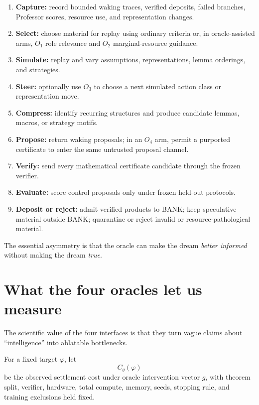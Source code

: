 \begin{enumerate}[leftmargin=2em]
\item \textbf{Capture:} record bounded waking traces, verified deposits, failed branches, Professor scores, resource use, and representation changes.
\item \textbf{Select:} choose material for replay using ordinary criteria or, in oracle-assisted arms, $O_1$ role relevance and $O_2$ marginal-resource guidance.
\item \textbf{Simulate:} replay and vary assumptions, representations, lemma orderings, and strategies.
\item \textbf{Steer:} optionally use $O_3$ to choose a next simulated action class or representation move.
\item \textbf{Compress:} identify recurring structures and produce candidate lemmas, macros, or strategy motifs.
\item \textbf{Propose:} return waking proposals; in an $O_4$ arm, permit a purported certificate to enter the same untrusted proposal channel.
\item \textbf{Verify:} send every mathematical certificate candidate through the frozen verifier.
\item \textbf{Evaluate:} score control proposals only under frozen held-out protocols.
\item \textbf{Deposit or reject:} admit verified products to BANK; keep speculative material outside BANK; quarantine or reject invalid or resource-pathological material.
\end{enumerate}

The essential asymmetry is that the oracle can make the dream \emph{better informed} without making the dream \emph{true}.

\section{What the four oracles let us measure}

The scientific value of the four interfaces is that they turn vague claims about ``intelligence'' into ablatable bottlenecks.

For a fixed target $\varphi$, let
\begin{equation}
C_g(\varphi)
\end{equation}
be the observed settlement cost under oracle intervention vector $g$, with theorem split, verifier, hardware, total compute, memory, seeds, stopping rule, and training exclusions held fixed.

